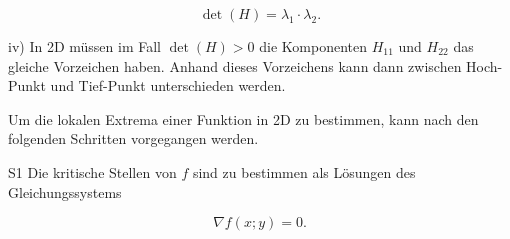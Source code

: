 \documentclass[10pt]{article}
\begin{document}
\begin{equation*}
\operatorname{det}(H)=\lambda_{1} \cdot \lambda_{2} . \tag{2.210}
\end{equation*}


iv) In 2D müssen im Fall $\operatorname{det}(H)>0$ die Komponenten $H_{11}$ und $H_{22}$ das gleiche Vorzeichen haben. Anhand dieses Vorzeichens kann dann zwischen Hoch-Punkt und Tief-Punkt unterschieden werden.

Um die lokalen Extrema einer Funktion in 2D zu bestimmen, kann nach den folgenden Schritten vorgegangen werden.

S1 Die kritische Stellen von $f$ sind zu bestimmen als Lösungen des Gleichungssystems


\begin{equation*}
\nabla f(x ; y)=0 . \tag{2.211}
\end{equation*}
\end{document}
